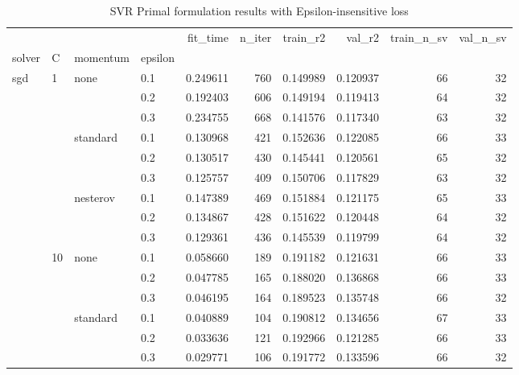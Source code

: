 \begin{table}[H]
\centering
\caption{SVR Primal formulation results with Epsilon-insensitive loss}
\label{primal_svr_eps_cv_results}
\begin{tabular}{llllrrrrrr}
\toprule
          &     &   &     &  fit\_time &  n\_iter &  train\_r2 &    val\_r2 &  train\_n\_sv &  val\_n\_sv \\
solver & C & momentum & epsilon &           &         &           &           &             &           \\
\midrule
sgd & 1   & none & 0.1 &  0.249611 &     760 &  0.149989 &  0.120937 &          66 &        32 \\
          &     &   & 0.2 &  0.192403 &     606 &  0.149194 &  0.119413 &          64 &        32 \\
          &     &   & 0.3 &  0.234755 &     668 &  0.141576 &  0.117340 &          63 &        32 \\
          &     & standard & 0.1 &  0.130968 &     421 &  0.152636 &  0.122085 &          66 &        33 \\
          &     &   & 0.2 &  0.130517 &     430 &  0.145441 &  0.120561 &          65 &        32 \\
          &     &   & 0.3 &  0.125757 &     409 &  0.150706 &  0.117829 &          63 &        32 \\
          &     & nesterov & 0.1 &  0.147389 &     469 &  0.151884 &  0.121175 &          65 &        33 \\
          &     &   & 0.2 &  0.134867 &     428 &  0.151622 &  0.120448 &          64 &        32 \\
          &     &   & 0.3 &  0.129361 &     436 &  0.145539 &  0.119799 &          64 &        32 \\
          & 10  & none & 0.1 &  0.058660 &     189 &  0.191182 &  0.121631 &          66 &        33 \\
          &     &   & 0.2 &  0.047785 &     165 &  0.188020 &  0.136868 &          66 &        33 \\
          &     &   & 0.3 &  0.046195 &     164 &  0.189523 &  0.135748 &          66 &        32 \\
          &     & standard & 0.1 &  0.040889 &     104 &  0.190812 &  0.134656 &          67 &        33 \\
          &     &   & 0.2 &  0.033636 &     121 &  0.192966 &  0.121285 &          66 &        33 \\
          &     &   & 0.3 &  0.029771 &     106 &  0.191772 &  0.133596 &          66 &        32 \\

\end{tabular}
\end{table}
